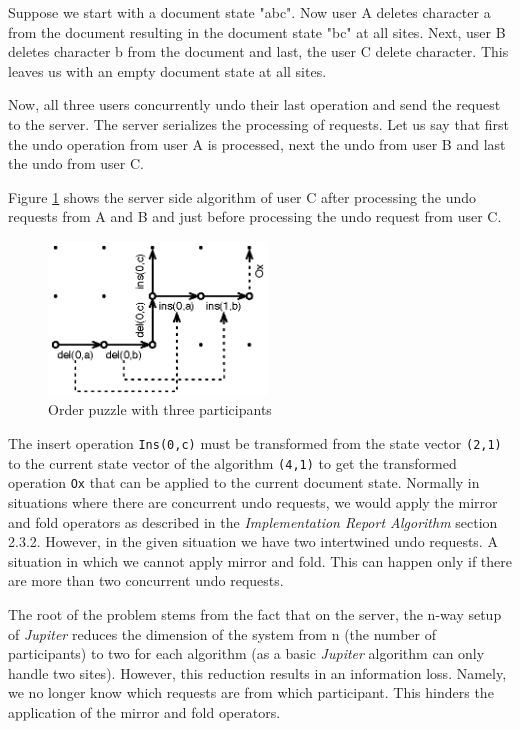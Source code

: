 Suppose we start with a document state "abc". Now user A deletes
character a from the document resulting in the document state "bc" at all sites.
Next, user B deletes character b from the document and last, the user C
delete character. This leaves us with an empty document state at all sites.

Now, all three users concurrently undo their last operation and send the
request to the server. The server serializes the processing of requests.
Let us say that first the undo operation from user A is processed, next
the undo from user B and last the undo from user C.

Figure \ref{fig:algorithm.undoredopuzzle} shows the server side
algorithm of user C after processing the undo requests from A and B and just
before processing the undo request from user C.

\begin{figure}[H]
 \centering
 \includegraphics[width=5.79cm,height=4.10cm]{../images/finalreport/algorithm_undopuzzle.eps}
 \caption{Order puzzle with three participants}
 \label{fig:algorithm.undoredopuzzle}
\end{figure}

The insert operation \texttt{Ins(0,c)} must be transformed from the state
vector \texttt{(2,1)} to the current state vector of the algorithm
\texttt{(4,1)} to get the transformed operation \texttt{Ox} that can
be applied to the current document state. 
Normally in situations where there are concurrent undo
requests, we would apply the mirror and fold operators as described
in the \emph{Implementation Report Algorithm} section 2.3.2.
However, in the given situation we have two intertwined undo requests. A
situation in which we cannot apply mirror and fold. This can happen only
if there are more than two concurrent undo requests.

The root of the problem stems from the fact that on the server, the
n-way setup of \emph{Jupiter} reduces the dimension of the system from
n (the number of participants) to two for 
each algorithm (as a basic \emph{Jupiter}
algorithm can only handle two sites). However, this reduction results in
an information loss. Namely, we no longer know which requests are from
which participant. This hinders the application of the mirror and fold
operators.

